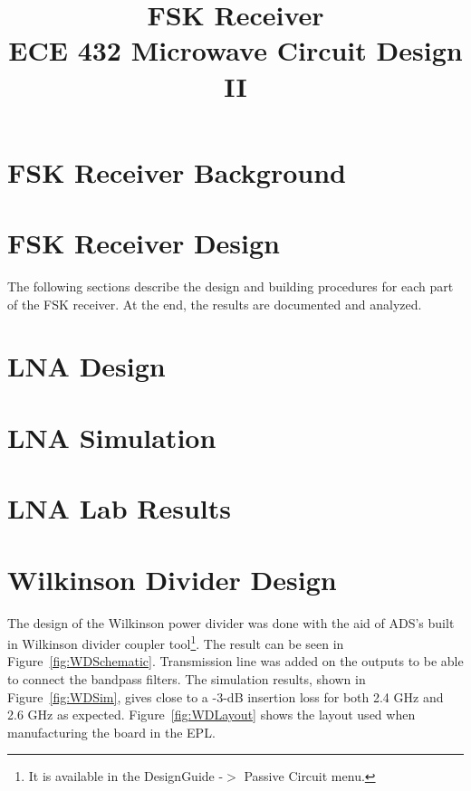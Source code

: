 \documentclass[conference]{IEEEtran}
\begin{document}
\title{FSK Receiver\\ECE 432 Microwave Circuit Design II}
\author{
}
\maketitle
\IEEEpeerreviewmaketitle
\section{FSK Receiver Background}

\section{FSK Receiver Design}
The following sections describe the design and building procedures for each part of the FSK receiver.  At the end, the results are documented and analyzed.

\section{LNA Design}
\section{LNA Simulation}
\section{LNA Lab Results}
\section{Wilkinson Divider Design}
The design of the Wilkinson power divider was done with the aid of ADS's built in Wilkinson divider coupler tool\footnote{It is available in the DesignGuide -$>$ Passive Circuit menu.}.  The result can be seen in Figure~\ref{fig:WDSchematic}.  Transmission line was added on the outputs to be able to connect the bandpass filters.  The simulation results, shown in Figure~\ref{fig:WDSim}, gives close to a -3-dB insertion loss for both 2.4 GHz and 2.6 GHz as expected.  Figure~\ref{fig:WDLayout} shows the layout used when manufacturing the board in the EPL.
\end{document}
